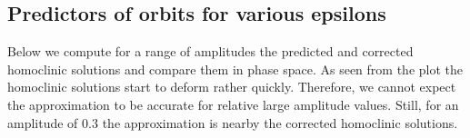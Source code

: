 \documentclass[letterpaper,10pt,english]{jupyterBook}
\begin{document}
\noindent{}


\subsection{Predictors of orbits for various epsilons}
\label{\detokenize{HodgkinHuxley:predictors-of-orbits-for-various-epsilons}}
\sphinxAtStartPar
Below we compute for a range of amplitudes the predicted and corrected
homoclinic solutions and compare them in phase space. As seen from the plot
{\hyperref[\detokenize{HodgkinHuxley:hh-continued-homoclinic-solutions-phase-space}]{}} the homoclinic
solutions start to deform rather quickly. Therefore, we cannot expect the
approximation to be accurate for relative large amplitude values. Still, for
an amplitude of \(0.3\) the approximation is nearby the corrected homoclinic
solutions.
\end{document}

